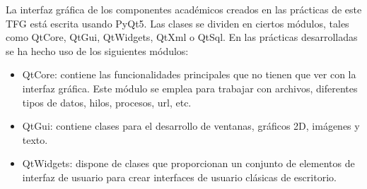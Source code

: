 La interfaz gráfica de los componentes académicos creados en las prácticas de este TFG está escrita usando PyQt5. Las clases se dividen en ciertos módulos, tales como QtCore, QtGui, QtWidgets, QtXml o QtSql. En las prácticas desarrolladas se ha hecho uso de los siguientes módulos:
\begin{itemize}
	\item QtCore: contiene las funcionalidades principales que no tienen que ver con la interfaz gráfica. Este módulo se emplea para trabajar con archivos, diferentes tipos de datos, hilos, procesos, url, etc.
	\item QtGui: contiene clases para el desarrollo de ventanas, gráficos 2D, imágenes y texto.
	\item QtWidgets: dispone de clases que proporcionan un conjunto de elementos de interfaz de usuario para crear interfaces de usuario clásicas de escritorio. 
\end{itemize}


